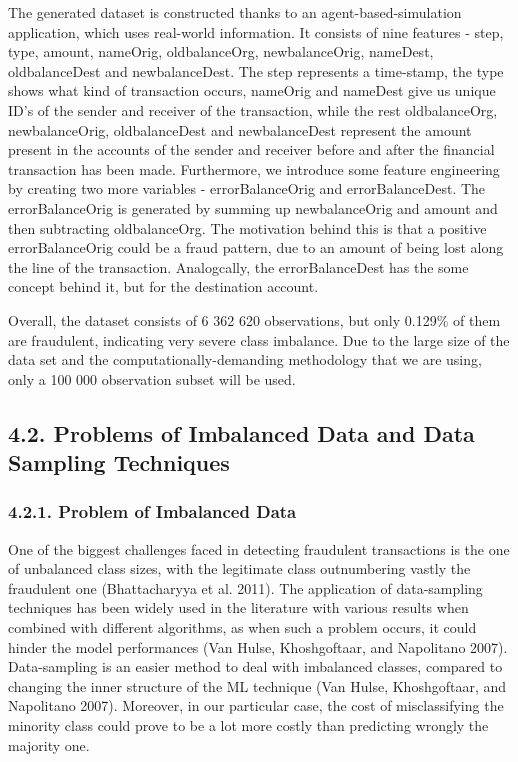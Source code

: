 \documentclass[12pt,]{article}
\begin{document}
The generated dataset is constructed thanks to an agent-based-simulation
application, which uses real-world information. It consists of nine
features - step, type, amount, nameOrig, oldbalanceOrg, newbalanceOrig,
nameDest, oldbalanceDest and newbalanceDest. The step represents a
time-stamp, the type shows what kind of transaction occurs, nameOrig and
nameDest give us unique ID's of the sender and receiver of the
transaction, while the rest oldbalanceOrg, newbalanceOrig,
oldbalanceDest and newbalanceDest represent the amount present in the
accounts of the sender and receiver before and after the financial
transaction has been made. Furthermore, we introduce some feature
engineering by creating two more variables - errorBalanceOrig and
errorBalanceDest. The errorBalanceOrig is generated by summing up
newbalanceOrig and amount and then subtracting oldbalanceOrg. The
motivation behind this is that a positive errorBalanceOrig could be a
fraud pattern, due to an amount of being lost along the line of the
transaction. Analogcally, the errorBalanceDest has the some concept
behind it, but for the destination account.

Overall, the dataset consists of 6 362 620 observations, but only
0.129\% of them are fraudulent, indicating very severe class imbalance.
Due to the large size of the data set and the computationally-demanding
methodology that we are using, only a 100 000 observation subset will be
used.

\hypertarget{problems-of-imbalanced-data-and-data-sampling-techniques}{%
\subsection{4.2. Problems of Imbalanced Data and Data Sampling
Techniques}\label{problems-of-imbalanced-data-and-data-sampling-techniques}}

\hypertarget{problem-of-imbalanced-data}{%
\subsubsection{4.2.1. Problem of Imbalanced
Data}\label{problem-of-imbalanced-data}}

One of the biggest challenges faced in detecting fraudulent transactions
is the one of unbalanced class sizes, with the legitimate class
outnumbering vastly the fraudulent one (Bhattacharyya et al. 2011). The
application of data-sampling techniques has been widely used in the
literature with various results when combined with different algorithms,
as when such a problem occurs, it could hinder the model performances
(Van Hulse, Khoshgoftaar, and Napolitano 2007). Data-sampling is an
easier method to deal with imbalanced classes, compared to changing the
inner structure of the ML technique (Van Hulse, Khoshgoftaar, and
Napolitano 2007). Moreover, in our particular case, the cost of
misclassifying the minority class could prove to be a lot more costly
than predicting wrongly the majority one.
\end{document}
